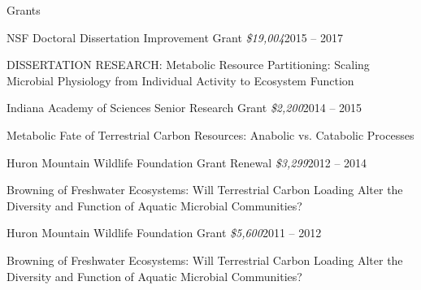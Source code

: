\documentclass{resume} %
\begin{document}

\begin{rSection}{Grants}

    \begin{rSubsection}{NSF Doctoral Dissertation Improvement Grant
      {\normalfont \em \$19,004}}{2015 -- 2017}{}{}
      \item DISSERTATION RESEARCH: Metabolic Resource Partitioning: Scaling
      Microbial Physiology from Individual Activity to Ecosystem Function
    \end{rSubsection}

    \begin{rSubsection}{Indiana Academy of Sciences Senior Research Grant
      {\normalfont \em \$2,200}}{2014 -- 2015}{}{}
      \item Metabolic Fate of Terrestrial Carbon Resources: Anabolic vs.
      Catabolic Processes
    \end{rSubsection}

    \begin{rSubsection}{Huron Mountain Wildlife Foundation Grant Renewal
      {\normalfont \em \$3,299}}{2012 -- 2014}{}{}
      \item Browning of Freshwater Ecosystems: Will Terrestrial Carbon Loading
      Alter the Diversity and Function of Aquatic Microbial Communities?
    \end{rSubsection}

    \begin{rSubsection}{Huron Mountain Wildlife Foundation Grant
      {\normalfont \em \$5,600}}{2011 -- 2012}{}{}
      \item Browning of Freshwater Ecosystems: Will Terrestrial Carbon Loading
      Alter the Diversity and Function of Aquatic Microbial Communities?
    \end{rSubsection}

\end{rSection}

\end{document}
